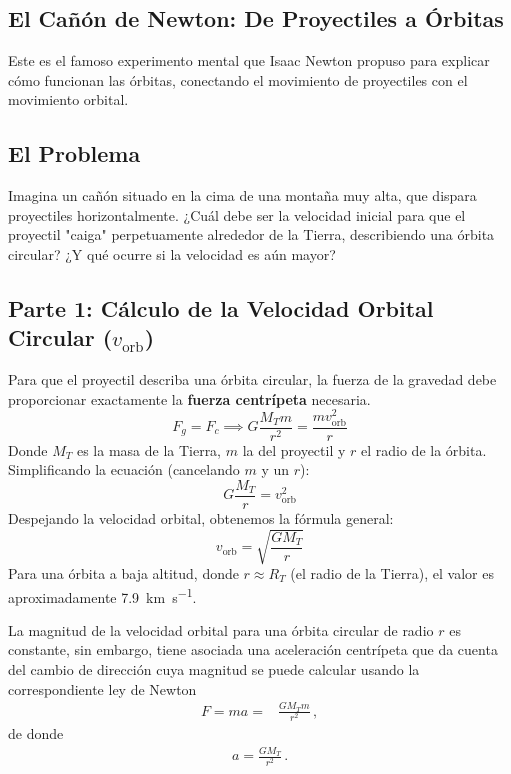 \documentclass[11pt,a4paper]{book}
\begin{document}



\subsection{El Cañón de Newton: De Proyectiles a Órbitas}

Este es el famoso experimento mental que Isaac Newton propuso para explicar cómo funcionan las órbitas, conectando el movimiento de proyectiles con el movimiento orbital.

\subsection*{El Problema}
Imagina un cañón situado en la cima de una montaña muy alta, que dispara proyectiles horizontalmente. ¿Cuál debe ser la velocidad inicial para que el proyectil "caiga" perpetuamente alrededor de la Tierra, describiendo una órbita circular? ¿Y qué ocurre si la velocidad es aún mayor?

\subsection*{Parte 1: Cálculo de la Velocidad Orbital Circular ($v_{\text{orb}}$)}
Para que el proyectil describa una órbita circular, la fuerza de la gravedad debe proporcionar exactamente la \textbf{fuerza centrípeta} necesaria.
\[ F_g = F_c \implies G \frac{M_T m}{r^2} = \frac{m v_{\text{orb}}^2}{r} \]
Donde $M_T$ es la masa de la Tierra, $m$ la del proyectil y $r$ el radio de la órbita. Simplificando la ecuación (cancelando $m$ y un $r$):
\[ G \frac{M_T}{r} = v_{\text{orb}}^2 \]
Despejando la velocidad orbital, obtenemos la fórmula general:
\begin{equation}
    \boxed{ v_{\text{orb}} = \sqrt{\frac{G M_T}{r}} }
\end{equation}
Para una órbita a baja altitud, donde $r \approx R_T$ (el radio de la Tierra), el valor es aproximadamente \SI{7.9}{\kilo\meter\per\second}.

La magnitud de la velocidad orbital para una órbita circular de radio $r$ es constante, sin embargo, tiene asociada una aceleración centrípeta  que da cuenta del cambio de dirección cuya magnitud se puede calcular usando la correspondiente ley de Newton
\begin{align*}
    F=ma =& \frac{GM_Tm}{r^2}\,,
\end{align*}
de donde
\begin{align}
a = \frac{GM_T}{r^2}\,.    
\end{align}
\end{document}
